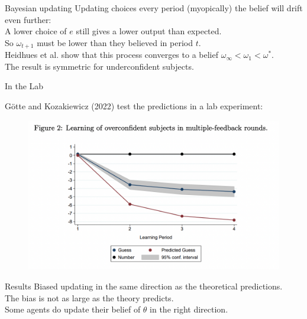 \documentclass[aspectratio=169]{beamer}
\begin{document}
\begin{frame}{Bayesian updating}
    Updating choices every period (myopically) the belief will drift even further:\\
    \bigskip
    A lower choice of $e$ still gives a lower output than expected. \\
    \bigskip
    So $\omega_{t+1}$ must be lower than they believed in period $t$.\\
    \bigskip
    Heidhues et al. show that this process converges to a belief $\omega_\infty<\omega_1<\omega^*.$\\
    \bigskip
    The result is symmetric for underconfident subjects.
    
\end{frame}

\begin{frame}{In the Lab}
\label{Figure1}

Götte and Kozakiewicz (2022) test the predictions in a lab experiment:

\begin{figure}
    \centering
    \includegraphics[scale=0.5]{figures/GK_experiment.png}
\end{figure}
    \hyperlink{Other Figures}{}

\end{frame}

\begin{frame}{Results}
    Biased updating in the same direction as the theoretical predictions.\\
    \bigskip
    The bias is not as large as the theory predicts.\\
    \bigskip
    Some agents do update their belief of $\theta$ in the right direction.\\
\end{frame}
\end{document}
